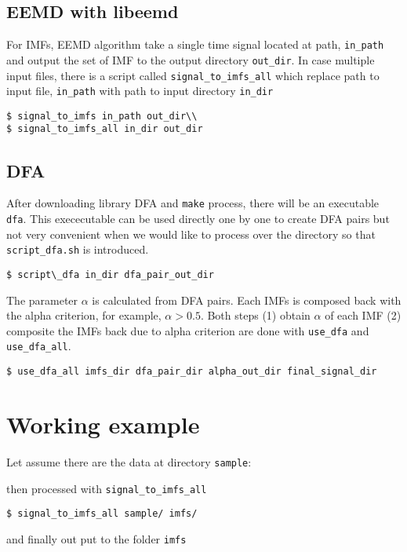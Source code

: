 \documentclass{article}
\begin{document}
\subsection*{EEMD with libeemd}
For IMFs, EEMD algorithm take a single time signal located at path, \texttt{in\_path} and output the set of IMF to the output directory \texttt{out\_dir}. In case multiple input files, there is a script called \texttt{signal\_to\_imfs\_all} which replace path to input file, \texttt{in\_path} with path to input directory \texttt{in\_dir}
\begin{verbatim}
$ signal_to_imfs in_path out_dir\\
$ signal_to_imfs_all in_dir out_dir
\end{verbatim}
\subsection*{DFA}
After downloading library DFA and \texttt{make} process, there will be an executable \texttt{dfa}. This exececutable can be used directly one by one to create DFA pairs but not very convenient when we would like to process over the directory so that \texttt{script\_dfa.sh} is introduced.\\
\begin{verbatim}
$ script\_dfa in_dir dfa_pair_out_dir
\end{verbatim}

The parameter $\alpha$ is calculated from DFA pairs. Each IMFs is composed back with the alpha criterion, for example, $\alpha > 0.5$. Both steps (1) obtain $\alpha$ of each IMF (2) composite the IMFs back due to alpha criterion are done with \texttt{use\_dfa} and \texttt{use\_dfa\_all}.
\begin{verbatim}
$ use_dfa_all imfs_dir dfa_pair_dir alpha_out_dir final_signal_dir
\end{verbatim}

\section*{Working example}
Let assume there are the data at directory \texttt{sample}:

then processed with \texttt{signal\_to\_imfs\_all}
\begin{verbatim}
$ signal_to_imfs_all sample/ imfs/
\end{verbatim}
and finally out put to the folder \texttt{imfs}

\end{document}
